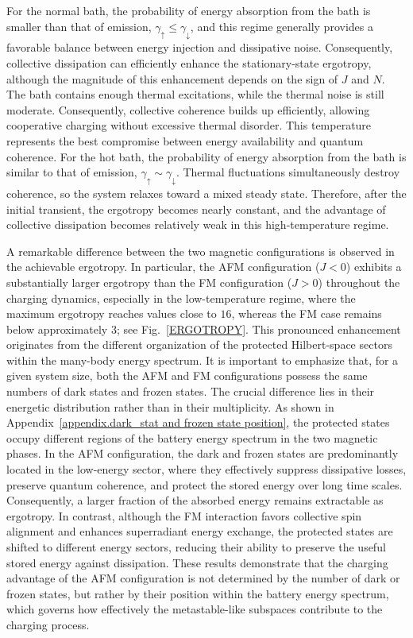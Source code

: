\documentclass[aps,superscriptaddress,twocolumn,pre,longbibliography,floatfix]{revtex4-1}
\begin{document}
	For the normal bath, the probability of energy absorption from the bath is smaller than that of emission, $\gamma_{\uparrow}\leq \gamma_{\downarrow}$, and this regime generally provides a favorable balance between energy injection and dissipative noise. Consequently, collective dissipation can efficiently enhance the stationary-state ergotropy, although the magnitude of this enhancement depends on the sign of $J$ and $N$. The bath contains enough thermal excitations, while the thermal noise is still moderate. Consequently, collective coherence builds up efficiently, allowing cooperative charging without excessive thermal disorder. This temperature represents the best compromise between energy availability and quantum coherence.
	For the hot bath, the probability of energy absorption from the bath is similar to that of emission, $\gamma_{\uparrow}\sim\gamma_{\downarrow}$. Thermal fluctuations simultaneously destroy coherence, so the system relaxes toward a mixed steady state. Therefore, after the initial transient, the ergotropy becomes nearly constant, and the advantage of collective dissipation becomes relatively weak in this high-temperature regime.
	
	A remarkable difference between the two magnetic configurations is observed in the achievable ergotropy. In particular, the AFM configuration ($J<0$) exhibits a substantially larger ergotropy than the FM configuration ($J>0$) throughout the charging dynamics, especially in the low-temperature regime, where the maximum ergotropy reaches values close to $16$, whereas the FM case remains below approximately $3$; see Fig.~\ref{ERGOTROPY}. This pronounced enhancement originates from the different organization of the protected Hilbert-space sectors within the many-body energy spectrum. It is important to emphasize that, for a given system size, both the AFM and FM configurations possess the same numbers of dark states and frozen states. The crucial difference lies in their energetic distribution rather than in their multiplicity. As shown in Appendix~\ref{appendix.dark_stat and frozen state position}, the protected states occupy different regions of the battery energy spectrum in the two magnetic phases. In the AFM configuration, the dark and frozen states are predominantly located in the low-energy sector, where they effectively suppress dissipative losses, preserve quantum coherence, and protect the stored energy over long time scales. Consequently, a larger fraction of the absorbed energy remains extractable as ergotropy. In contrast, although the FM interaction favors collective spin alignment and enhances superradiant energy exchange, the protected states are shifted to different energy sectors, reducing their ability to preserve the useful stored energy against dissipation. These results demonstrate that the charging advantage of the AFM configuration is not determined by the number of dark or frozen states, but rather by their position within the battery energy spectrum, which governs how effectively the metastable-like subspaces contribute to the charging process.
	
\end{document}

